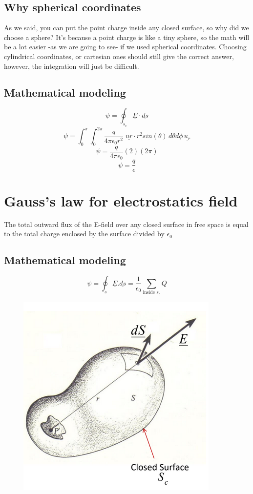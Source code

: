 \documentclass[12 pt]{article}
\begin{document}
\subsection{Why spherical coordinates}
As we said, you can put the point charge inside any closed surface, so why did we choose a sphere? It's because a point charge is like a tiny sphere, so the math will be a lot easier -as we are going to see- if we used spherical coordinates. Choosing cylindrical coordinates, or cartesian ones should still give the correct answer, however, the integration will just be difficult.
\subsection{Mathematical modeling}
$$
\psi =\oint_{s_c} \underline{E} \cdot \underline{ds}
$$
$$
\psi=\int_{0}^{\pi} \int_{0}^{2\pi} \frac{q}{4\pi\epsilon_0 r^2}\;\underline{ur}\cdot r^2 sin(\theta)\,d\theta d\phi\,\underline{u_r} 
$$
$$
\psi= \frac{q}{4\pi \epsilon_0}(2)(2\pi)
$$
$$
\boxed{
    \psi=\frac{q}{\epsilon}
}
$$
\section{Gauss's law for electrostatics field}
The total outward flux of the E-field over any closed surface in free space is equal to the total charge enclosed
by the surface divided by $\epsilon_0$
\subsection{Mathematical modeling}
\begin{minipage}{0.35\linewidth}
$$
\boxed{\psi= \oint_s \underline{E}.\underline{ds}=\frac{1}{\epsilon_0} \sum_{\text{inside }s_c}Q}
$$
\end{minipage}
\begin{minipage}{0.6\linewidth}
    \begin{figure}[H]
        \centering
        \includegraphics[scale=0.5]{./images/gauss}
        \label{gauss} 
    \end{figure}
\end{minipage}
\end{document}
